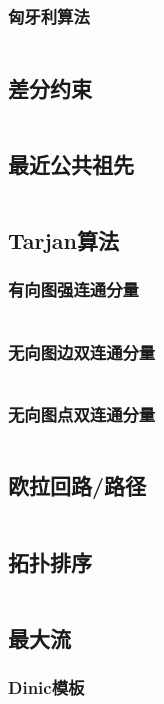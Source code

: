 \documentclass[a4paper,10pt]{article}
\begin{document}
\subsubsection{匈牙利算法} 
\inputminted[breaklines, linenos]{c++}{graph/2graph/xyl.cc}
\subsection{差分约束} %
\inputminted[breaklines, linenos]{c++}{graph/cfys/cfys.cc}
\subsection{最近公共祖先} %
\inputminted[breaklines, linenos]{c++}{graph/lca/lca.cc}
\subsection{Tarjan算法} %
\subsubsection{有向图强连通分量} 
\inputminted[breaklines, linenos]{c++}{graph/tarjan/scc.cc}
\subsubsection{无向图边双连通分量} 
\inputminted[breaklines, linenos]{c++}{graph/tarjan/edcc.cc}
\subsubsection{无向图点双连通分量} 
\inputminted[breaklines, linenos]{c++}{graph/tarjan/vdcc.cc}
\subsection{欧拉回路/路径} %
\inputminted[breaklines, linenos]{c++}{graph/eluer/eluer.cc}
\subsection{拓扑排序} %
\inputminted[breaklines, linenos]{c++}{graph/topsort/top.cc}
\subsection{最大流}
\subsubsection{Dinic模板}
\inputminted[breaklines, linenos]{c++}{graph/flow/dinic.cc}
\end{document}
